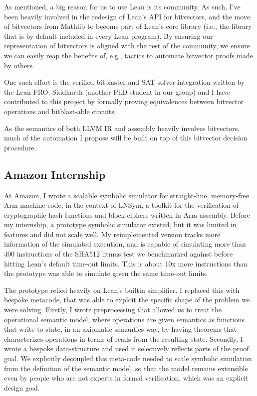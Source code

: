 \documentclass[a4paper]{scrartcl}
\begin{document}
As mentioned, a big reason for us to use Lean is its community. As
such, I've been heavily involved in the redesign of Lean's API for
bitvectors, and the move of bitvectors from Mathlib to become part of Lean's core library
(i.e., the library that is by default included in every Lean program).
By ensuring our representation of bitvectors is aligned with the rest of
the community, we ensure we can easily reap the benefits of, e.g.,
tactics to automate bitvector proofs made by others.

One such effort is the verified bitblaster and SAT solver integration written by the Lean FRO.
Siddharth (another PhD student in our group) and I have contributed to this project by 
formally proving equivalences between bitvector operations and bitblast-able circuits.

As the semantics of both LLVM IR and assembly heavily involves bitvectors, much of 
the automation I propose will be built on top of this bitvector decision procedure.

\subsection{Amazon Internship}\label{amazon-internship}

At Amazon, I wrote a scalable symbolic simulator for straight-line, memory-free Arm machine code, in the context of LNSym, 
a toolkit for the verification of cryptographic hash functions and block ciphers written in Arm assembly.
Before my internship, a prototype symbolic simulator existed, but it was limited in features and did not scale well.
My reimplemented version tracks more information of the simulated execution, 
and is capable of simulating more than 400 instructions of the SHA512 litmus test we benchmarked against before hitting Lean's default time-out limits.
This is about 10x more instructions than the prototype was able to simulate given the same time-out limits.

The prototype relied heavily on Lean's builtin simplifier. 
I replaced this with bespoke metacode, that was able to exploit the specific shape of the problem we were solving.
Firstly, I wrote preprocessing that allowed us to treat the operational semantic model, where operations are given semantics as functions that write to state, 
in an axiomatic-semantics way, by having theorems that characterizes operations in terms of reads from the resulting state.
Secondly, I wrote a bespoke data-structure and used it selectively reflects parts of the proof goal.
We explicitly decoupled this meta-code needed to scale symbolic simulation from the definition of the semantic model,
so that the model remains extensible even by people who are not experts in formal verification, which was an explicit design goal.
\end{document}
